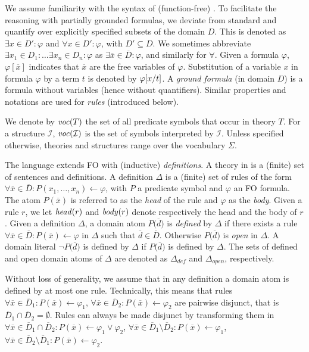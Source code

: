\documentclass[11pt]{article}
\newcommand{\m}[1]{\ensuremath{#1}\xspace}
\newcommand{\lrule}{\m{\leftarrow}}
\newcommand{\voc}{\m{\Sigma}}
\newcommand{\I}{\m{\mathcal{I}}}
\newcommand{\D}{\m{\Delta}}
\newcommand{\f}{\m{\varphi}}
\newcommand{\defined}[1]{\m{#1_{def}}}
\newcommand{\open}[1]{\m{#1_{open}}}
\newcommand{\xxx}{\m{\overline{x}}}
\newcommand{\ddd}{\m{\overline{d}}}
\newcommand{\bracketddd}{\m{\big(\overline{d}\big)}}
\newcommand{\DDD}{\m{\overline{D}}}
\newcommand{\typed}[2]{\m{#1\in #2:}}
\newcommand{\logicname}[1]{\text{\sc #1}\xspace}
\newcommand{\foid}{\logicname{FO(\ensuremath{ID})}}
\theoremstyle{plain}
\theoremstyle{definition}
\theoremstyle{example_basic}
\theoremstyle{example_contd}
\theoremstyle{plain}
\newcommand{\change}[1]{#1}
\begin{document}
We assume familiarity with the syntax of (function-free) \FO. 
\change{To facilitate the reasoning with partially grounded formulas,
  we deviate from standard \FO and quantify  over explicitly
specified subsets of the domain $D$. This is denoted as $\exists
\typed{x}{D'} \f$ and $\forall \typed{x}{D'} \f$, with $D'\subseteq
D$.}
We sometimes abbreviate $\exists x_1\in D_1: \ldots \exists x_n \in D_n: \f$ as $\exists \xxx\in\DDD: \f$, and similarly for $\forall$. Given a formula \f, $\f[\xxx]$ indicates that $\xxx$ are the free variables of \f. Substitution of a variable $x$ in formula \f by a term $t$ is denoted by $\f[x\subs t]$.  A \emph{ground formula} (in domain $D$) is a formula without variables (hence without quantifiers). Similar properties and notations are used for \emph{rules} (introduced below).

We denote by $\vocf{T}$ the set of all predicate symbols that occur in theory $T$. For a structure $\I$, $\vocf{\I}$ is the set of symbols interpreted by $\I$. Unless specified otherwise, theories and structures range over the vocabulary \voc. 

The language \foid extends FO with (inductive) \emph{definitions}. A
theory in \foid is  a (finite) set of sentences and definitions. A
definition \D is a (finite) set of rules of the form $\forall \xxx\in\DDD:
P(x_1,\dots,x_n) \lrule \f$, with $P$ a predicate symbol and \f an FO
formula. The atom $P(\xxx)$ is referred to as the \emph{head} of the
rule and \f as the \emph{body}.  Given a rule $r$, we let $\head{r}$
and $\body{r}$ denote respectively the head and the body of $r$.
Given a definition \D, a domain atom $P\bracketddd$ is {\em defined}
by $\D$ if there exists a rule $\forall \xxx \in \DDD: P(\xxx)\lrule
\f$ in $\D$ such that $\ddd\in \DDD$. Otherwise $P\bracketddd$ is
\emph{open} in \D. A domain literal $\lnot P\bracketddd$ is defined by
\D if $P\bracketddd$ is defined by \D. The sets of defined and open
domain atoms of \D are denoted as $\defined{\D}$ and $\open{\D}$,
respectively.

Without loss of generality, we assume that in any definition a domain
atom is defined by at most one rule. \change{Technically, this means that rules $\forall \xxx\in\DDD_1: P(\xxx) \lrule \f_1$, $\forall
\xxx\in\DDD_2: P(\xxx) \lrule \f_2$ are pairwise disjunct, that is
$\DDD_1\cap\DDD_2=\emptyset$. Rules can always be made disjunct by
transforming them in $\forall \xxx\in\DDD_1\cap\DDD_2: P(\xxx)
\lrule \f_1 \lor \f_2$, $\forall \xxx\in\DDD_1\setminus\DDD_2: P(\xxx)
\lrule \f_1$, $\forall \xxx\in\DDD_2\setminus\DDD_1: P(\xxx) \lrule \f_2$.}
\end{document}
